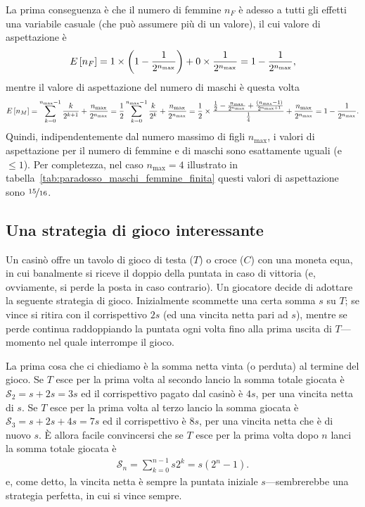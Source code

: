 La prima conseguenza è che il numero di femmine $n_F$ è adesso a tutti gli
effetti una variabile casuale (che può assumere più di un valore), il cui
valore di aspettazione è
\begin{align*}
  \displaystyle E\left[n_F\right] = 1 \times \left(1 - \frac{1}{2^{n_\text{max}}} \right) +
  0 \times \frac{1}{2^{n_\text{max}}} = 1 - \frac{1}{2^{n_\text{max}}},
\end{align*}
mentre il valore di aspettazione del numero di maschi è questa volta
\begin{align}
  \displaystyle E\left[n_M\right] = \sum_{k = 0}^{n_\text{max} - 1} \frac{k}{2^{k+1}} +
  \frac{n_\text{max}}{2^{n_\text{max}}} =
  \frac{1}{2} \sum_{k = 0}^{n_\text{max} - 1} \frac{k}{2^k} +
  \frac{n_\text{max}}{2^{n_\text{max}}} =
  \frac{1}{2} \times \frac{\frac{1}{2} -
    \frac{n_\text{max}}{2^{n_\text{max}}} +
    \frac{(n_\text{max} - 1)}{2^{n_\text{max} + 1}}}{\frac{1}{4}} +
  \frac{n_\text{max}}{2^{n_\text{max}}} = 1 - \frac{1}{2^{n_\text{max}}}.
\end{align}
Quindi, indipendentemente dal numero massimo di figli $n_\text{max}$, i valori
di aspettazione per il numero di femmine e di maschi sono esattamente uguali
(e $\leq 1$). Per completezza, nel caso $n_\text{max} = 4$ illustrato in
tabella~\ref{tab:paradosso_maschi_femmine_finita} questi valori di aspettazione
sono $\nicefrac{15}{16}$.


\subsection{Una strategia di gioco interessante}

Un casinò offre un tavolo di gioco di testa ($T$) o croce ($C$) con una moneta
equa, in cui banalmente si riceve il doppio della puntata in caso di vittoria
(e, ovviamente, si perde la posta in caso contrario).
Un giocatore decide di adottare la seguente strategia di gioco. Inizialmente
scommette una certa somma $s$ su $T$; se vince si ritira con il corrispettivo
$2s$ (ed una vincita netta pari ad $s$), mentre se perde continua raddoppiando
la puntata ogni volta fino alla prima uscita di $T$---momento nel quale
interrompe il gioco.

La prima cosa che ci chiediamo è la somma netta vinta (o perduta) al termine
del gioco. Se $T$ esce per la prima volta al secondo lancio la somma totale
giocata è $\mathcal{S}_2 = s + 2s = 3s$ ed il corrispettivo pagato dal
casinò è $4s$, per una vincita netta di $s$. Se $T$ esce per la prima volta
al terzo lancio la somma giocata è $\mathcal{S}_3 = s + 2s + 4s = 7s$ ed il
corrispettivo è $8s$, per una vincita netta che è di nuovo $s$. \`E allora
facile convincersi che se $T$ esce per la prima volta dopo $n$ lanci la somma
totale giocata è
\begin{align*}
  \mathcal{S}_n = \sum_{k = 0}^{n - 1} s 2^k = s(2^n - 1).
\end{align*}
e, come detto, la vincita netta è sempre la puntata iniziale $s$---sembrerebbe
una strategia perfetta, in cui si vince sempre.

